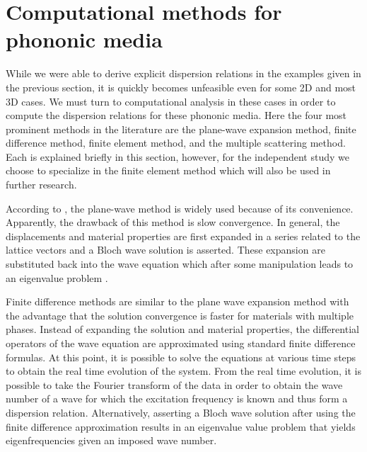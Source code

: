 \documentclass{article}
\begin{document}
\section{Computational methods for phononic media} \label{methods}
While we were able to derive explicit dispersion relations in the examples 
given in the previous section, it is quickly becomes unfeasible even for some 
2D and most 3D cases. We must turn to computational analysis in these cases in 
order to compute the dispersion relations for these phononic media. Here the 
four most prominent methods in the literature are the plane-wave expansion 
method, finite difference method, finite element method, and the multiple 
scattering method. Each is explained briefly in this section, however, for the 
independent study we choose to specialize in the finite element method which 
will also be used in further research.

According to \cite{cao04}, the plane-wave method is widely used because of its 
convenience. Apparently, the drawback of this method is slow convergence. In 
general, the displacements and material properties are first expanded in a 
series related to the lattice vectors and a Bloch wave solution is asserted. 
These expansion are substituted back into the wave equation which after some 
manipulation leads to an eigenvalue problem \cite{hussein14}.

Finite difference methods are similar to the plane wave expansion method with 
the advantage that the solution convergence is faster for materials with 
multiple phases. Instead of expanding the solution and material properties, the 
differential operators of the wave equation are approximated using standard 
finite difference formulas. At this point, it is possible to solve the 
equations at various time steps to obtain the real time evolution of the 
system. From the real time evolution, it is possible to take the Fourier 
transform of the data in order to obtain the wave number of a wave for which 
the excitation frequency is known and thus form a dispersion relation. 
Alternatively, asserting a Bloch wave solution after using the finite 
difference approximation results in an eigenvalue value problem that yields 
eigenfrequencies given an imposed wave number. 
\end{document}

